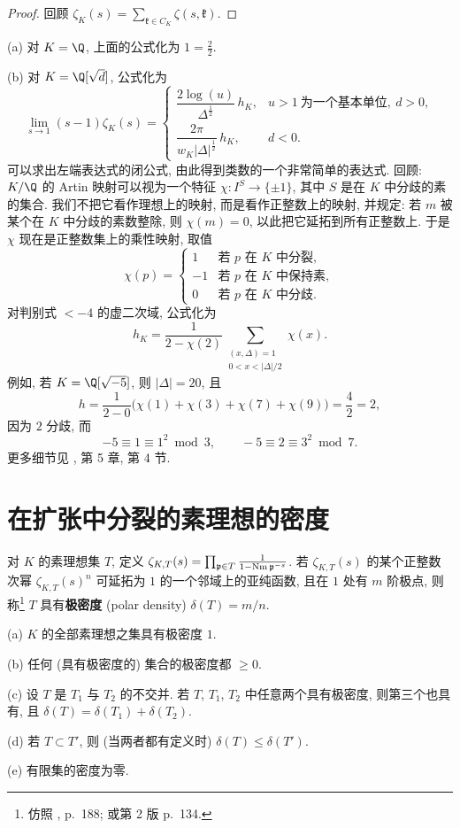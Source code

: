 \begin{proof}
回顾 $\zeta_K(s)=\sum_{\mathfrak{k}\in C_K}\zeta(s,\mathfrak{k})$.
\end{proof}

\begin{example}\label{ex:vi.2.13}
(a) 对 $K=\Q$, 上面的公式化为 $1=\frac{2}{2}$.

(b) 对 $K=\Q[\sqrt{d}]$, 公式化为
\[
\lim_{s\to1}(s-1)\zeta_{K}(s)=
\begin{cases}
\dfrac{2\log(u)}{\Delta^{\frac{1}{2}}}\,h_{K}, & u>1\ \text{为一个基本单位},\ d>0,\\[2ex]
\dfrac{2\pi}{w_{K}|\Delta|^{\frac{1}{2}}}\,h_{K}, & d<0.
\end{cases}
\]
可以求出左端表达式的闭公式, 由此得到类数的一个非常简单的表达式. 回顾: $K/\Q$ 的 Artin 映射可以视为一个特征 $\chi\colon I^S\to\{\pm1\}$, 其中 $S$ 是在 $K$ 中分歧的素的集合. 我们不把它看作理想上的映射, 而是看作正整数上的映射, 并规定: 若 $m$ 被某个在 $K$ 中分歧的素数整除, 则 $\chi(m)=0$, 以此把它延拓到所有正整数上. 于是 $\chi$ 现在是正整数集上的乘性映射, 取值
\[
\chi(p)=
\begin{cases}
1 & \text{若 $p$ 在 $K$ 中分裂},\\
-1 & \text{若 $p$ 在 $K$ 中保持素},\\
0 & \text{若 $p$ 在 $K$ 中分歧}.
\end{cases}
\]
对判别式 $<-4$ 的虚二次域, 公式化为
\[
h_{K}=\frac{1}{2-\chi(2)}\sum_{\substack{(x,\Delta)=1\\ 0<x<|\Delta|/2}}\chi(x).
\]
例如, 若 $K=\Q[\sqrt{-5}]$, 则 $|\Delta|=20$, 且
\[
h=\frac{1}{2-0}\bigl(\chi(1)+\chi(3)+\chi(7)+\chi(9)\bigr)=\frac{4}{2}=2,
\]
因为 $2$ 分歧, 而
\[
-5\equiv1\equiv1^{2}\bmod 3,\qquad -5\equiv2\equiv3^{2}\bmod 7.
\]
更多细节见 \cite{BorevichShafarevich1966}, 第 5 章, 第 4 节.
\end{example}

\section{在扩张中分裂的素理想的密度}\label{sec:VI.3}

对 $K$ 的素理想集 $T$, 定义 $\zeta_{K,T}(s)=\prod_{\mathfrak{p}\in T}\frac{1}{1-\operatorname{Nm}\mathfrak{p}^{-s}}$. 若 $\zeta_{K,T}(s)$ 的某个正整数次幂 $\zeta_{K,T}(s)^{n}$ 可延拓为 $1$ 的一个邻域上的亚纯函数, 且在 $1$ 处有 $m$ 阶极点, 则称\footnote{仿照 \cite{Marcus1977}, p.~188; 或第 2 版 p.~134.} $T$ 具有\textbf{极密度} (polar density) $\delta(T)=m/n$.

\begin{proposition}\label{prop:vi.3.1}
(a) $K$ 的全部素理想之集具有极密度 $1$.

(b) 任何 (具有极密度的) 集合的极密度都 $\ge0$.

(c) 设 $T$ 是 $T_1$ 与 $T_2$ 的不交并. 若 $T$, $T_1$, $T_2$ 中任意两个具有极密度, 则第三个也具有, 且 $\delta(T)=\delta(T_1)+\delta(T_2)$.

(d) 若 $T\subset T'$, 则 (当两者都有定义时) $\delta(T)\le\delta(T')$.

(e) 有限集的密度为零.
\end{proposition}

